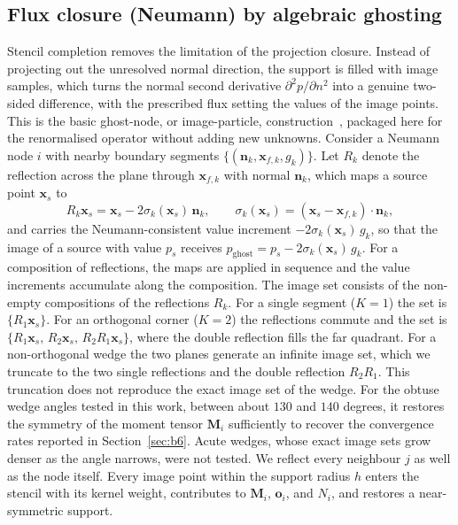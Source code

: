\documentclass[preprint,review,12pt]{elsarticle}
\newcommand{\Mi}{\mathbf{M}_i}
\newcommand{\oi}{\mathbf{o}_i}
\begin{document}
\subsection{Flux closure (Neumann) by algebraic ghosting}
\label{sec:ghost}

Stencil completion removes the limitation of the projection closure.
Instead of projecting out the unresolved normal direction, the support is filled with image samples, which turns the normal second derivative $\partial^2 p/\partial n^2$ into a genuine two-sided difference, with the prescribed flux setting the values of the image points.
This is the basic ghost-node, or image-particle, construction~\cite{Gibou2002,LeVeque2007}, packaged here for the renormalised operator without adding new unknowns.
Consider a Neumann node $i$ with nearby boundary segments $\{(\mathbf n_k,\mathbf x_{f,k},g_k)\}$.
Let $R_k$ denote the reflection across the plane through $\mathbf x_{f,k}$ with normal $\mathbf n_k$, which maps a source point $\mathbf x_s$ to
\begin{equation}
  R_k\mathbf x_s=\mathbf x_s-2\sigma_k(\mathbf x_s)\,\mathbf n_k,
  \qquad
  \sigma_k(\mathbf x_s)=(\mathbf x_s-\mathbf x_{f,k})\cdot\mathbf n_k,
  \label{eq:reflection}
\end{equation}
and carries the Neumann-consistent value increment $-2\sigma_k(\mathbf x_s)\,g_k$, so that the image of a source with value $p_s$ receives $p_{\mathrm{ghost}}=p_s-2\sigma_k(\mathbf x_s)\,g_k$.
For a composition of reflections, the maps are applied in sequence and the value increments accumulate along the composition.
The image set consists of the non-empty compositions of the reflections $R_k$.
For a single segment ($K=1$) the set is $\{R_1\mathbf x_s\}$.
For an orthogonal corner ($K=2$) the reflections commute and the set is $\{R_1\mathbf x_s,\,R_2\mathbf x_s,\,R_2R_1\mathbf x_s\}$, where the double reflection fills the far quadrant.
For a non-orthogonal wedge the two planes generate an infinite image set, which we truncate to the two single reflections and the double reflection $R_2R_1$.
This truncation does not reproduce the exact image set of the wedge.
For the obtuse wedge angles tested in this work, between about $130$ and $140$ degrees, it restores the symmetry of the moment tensor $\Mi$ sufficiently to recover the convergence rates reported in Section~\ref{sec:b6}.
Acute wedges, whose exact image sets grow denser as the angle narrows, were not tested.
We reflect every neighbour $j$ as well as the node itself.
Every image point within the support radius $h$ enters the stencil with its kernel weight, contributes to $\Mi$, $\oi$, and $N_i$, and restores a near-symmetric support.
\end{document}
